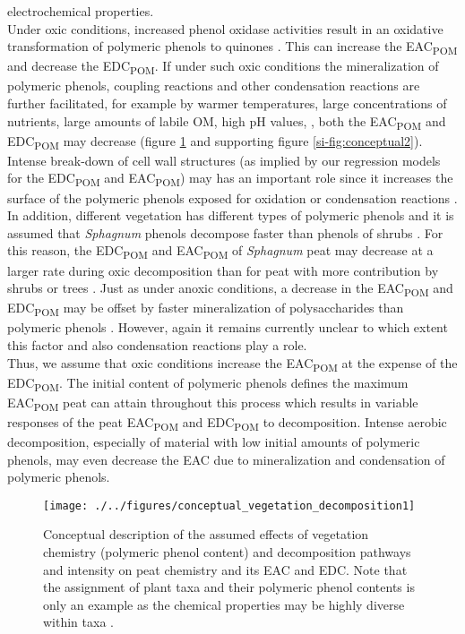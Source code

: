 \documentclass[draft,linenumbers]{agujournal2018}
\begin{document}
electrochemical properties.\\
Under oxic conditions, increased phenol oxidase activities result in an
oxidative transformation of polymeric phenols to quinones
\citep{Fenner.2011, Schellekens.2015, Bolton.2018}. This can increase
the EAC\textsubscript{POM} and decrease the EDC\textsubscript{POM}. If
under such oxic conditions the mineralization of polymeric phenols,
coupling reactions
\citep{Hotta.2002, Johnson.2015, Bolton.2018, Zhao.2020} and other
condensation reactions
\citep{Bolton.2018, Olk.2006, Heitmann.2006, Yu.2016} are further
facilitated, for example by warmer temperatures, large concentrations of
nutrients, large amounts of labile OM, high pH values,
\citep{Bragazza.2007, Fenner.2011, Kang.2018c, Bowring.2020}, both the
EAC\textsubscript{POM} and EDC\textsubscript{POM} may decrease (figure
\ref{fig:conceptual1} and supporting figure \ref{si-fig:conceptual2}).
Intense break-down of cell wall structures (as implied by our regression
models for the EDC\textsubscript{POM} and EAC\textsubscript{POM}) may
has an important role since it increases the surface of the polymeric
phenols exposed for oxidation or condensation reactions
\citep{Tsuneda.2001}. In addition, different vegetation has different
types of polymeric phenols and it is assumed that \emph{Sphagnum}
phenols decompose faster than phenols of shrubs \citep{Wang.2015}. For
this reason, the EDC\textsubscript{POM} and EAC\textsubscript{POM} of
\emph{Sphagnum} peat may decrease at a larger rate during oxic
decomposition than for peat with more contribution by shrubs or trees
\citep{Wang.2015}. Just as under anoxic conditions, a decrease in the
EAC\textsubscript{POM} and EDC\textsubscript{POM} may be offset by
faster mineralization of polysaccharides than polymeric phenols
\citep{Benner.1984}. However, again it remains currently unclear to
which extent this factor and also condensation reactions play a role.\\
Thus, we assume that oxic conditions increase the EAC\textsubscript{POM}
at the expense of the EDC\textsubscript{POM}. The initial content of
polymeric phenols defines the maximum EAC\textsubscript{POM} peat can
attain throughout this process which results in variable responses of
the peat EAC\textsubscript{POM} and EDC\textsubscript{POM} to
decomposition. Intense aerobic decomposition, especially of material
with low initial amounts of polymeric phenols, may even decrease the EAC
due to mineralization and condensation of polymeric phenols.

\begin{figure}[H]

{\centering \texttt{[image: ./../figures/conceptual\_vegetation\_decomposition1]} 

}

\caption{Conceptual description of the assumed effects of vegetation chemistry (polymeric phenol content) and decomposition pathways and intensity on peat chemistry and its EAC and EDC. Note that the assignment of plant taxa and their polymeric phenol contents is only an example as the chemical properties may be highly diverse within taxa \citet{Bengtsson.2018}.}\label{fig:conceptual1}
\end{figure}
\end{document}
